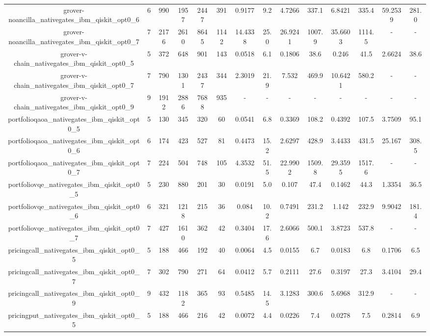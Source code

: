 \begin{table}[htb]
{\begin{tabular}{|c|c|c|c|c|c|c|c|c|c|c|c|c|c|}
grover-noancilla\_nativegates\_ibm\_qiskit\_opt0\_6 & 6 & 990 & 1957 & 2447 & 391 & 0.9177 & 9.2 & 4.7266 & 337.1 & 6.8421 & 335.4 & 59.2539 & 281.0 \\ 
grover-noancilla\_nativegates\_ibm\_qiskit\_opt0\_7 & 7 & 2176 & 2610 & 8645 & 1142 & 14.4338 & 25.0 & 26.9241 & 1007.9 & 35.6603 & 1114.5 & - & - \\ 
grover-v-chain\_nativegates\_ibm\_qiskit\_opt0\_5 & 5 & 372 & 648 & 901 & 143 & 0.0518 & 6.1 & 0.1806 & 38.6 & 0.246 & 41.5 & 2.6624 & 38.6 \\ 
grover-v-chain\_nativegates\_ibm\_qiskit\_opt0\_7 & 7 & 790 & 1301 & 2437 & 344 & 2.3019 & 21.9 & 7.532 & 469.9 & 10.6421 & 580.2 & - & - \\ 
grover-v-chain\_nativegates\_ibm\_qiskit\_opt0\_9 & 9 & 1912 & 2886 & 7688 & 935 & - & - & - & - & - & - & - & - \\ 
portfolioqaoa\_nativegates\_ibm\_qiskit\_opt0\_5 & 5 & 130 & 345 & 320 & 60 & 0.0541 & 6.8 & 0.3369 & 108.2 & 0.4392 & 107.5 & 3.7509 & 95.1 \\ 
portfolioqaoa\_nativegates\_ibm\_qiskit\_opt0\_6 & 6 & 174 & 423 & 527 & 81 & 0.4473 & 15.2 & 2.6297 & 428.9 & 3.4433 & 431.5 & 25.167 & 308.5 \\ 
portfolioqaoa\_nativegates\_ibm\_qiskit\_opt0\_7 & 7 & 224 & 504 & 748 & 105 & 4.3532 & 51.5 & 22.9902 & 1509.8 & 29.3595 & 1517.6 & - & - \\ 
portfoliovqe\_nativegates\_ibm\_qiskit\_opt0\_5 & 5 & 230 & 880 & 201 & 30 & 0.0191 & 5.0 & 0.107 & 47.4 & 0.1462 & 44.3 & 1.3354 & 36.5 \\ 
portfoliovqe\_nativegates\_ibm\_qiskit\_opt0\_6 & 6 & 321 & 1218 & 215 & 36 & 0.084 & 10.2 & 0.7491 & 231.2 & 1.142 & 232.9 & 9.9042 & 181.4 \\ 
portfoliovqe\_nativegates\_ibm\_qiskit\_opt0\_7 & 7 & 427 & 1610 & 362 & 42 & 0.3404 & 17.6 & 2.6066 & 500.1 & 3.8723 & 537.8 & - & - \\ 
pricingcall\_nativegates\_ibm\_qiskit\_opt0\_5 & 5 & 188 & 466 & 192 & 40 & 0.0064 & 4.5 & 0.0155 & 6.7 & 0.0183 & 6.8 & 0.1706 & 6.5 \\ 
pricingcall\_nativegates\_ibm\_qiskit\_opt0\_7 & 7 & 302 & 790 & 271 & 64 & 0.0412 & 5.7 & 0.2111 & 27.6 & 0.3197 & 27.3 & 3.4104 & 29.4 \\ 
pricingcall\_nativegates\_ibm\_qiskit\_opt0\_9 & 9 & 432 & 1182 & 365 & 93 & 0.5485 & 14.5 & 3.1283 & 300.6 & 5.6968 & 312.9 & - & - \\ 
pricingput\_nativegates\_ibm\_qiskit\_opt0\_5 & 5 & 188 & 466 & 216 & 42 & 0.0072 & 4.4 & 0.0226 & 7.4 & 0.0278 & 7.5 & 0.2814 & 6.9 \\ 

\end{tabular}}
\end{table}

